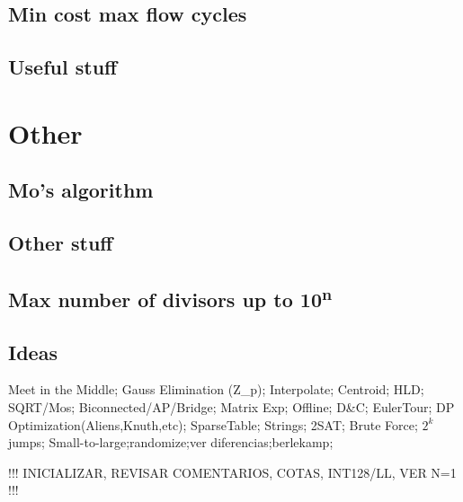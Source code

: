 \begin{multicols}{2}
\subsection{Min cost max flow cycles}

\subsection{Useful stuff}



\section{Other}

\subsection{Mo's algorithm}

\subsection{Other stuff}

\subsection{Max number of divisors up to 10\textsuperscript{n}}

\subsection{Ideas}
Meet in the Middle; Gauss Elimination (Z\_p); Interpolate; Centroid; HLD;
SQRT/Mos; Biconnected/AP/Bridge; Matrix Exp; Offline; D\&C; EulerTour;
DP Optimization(Aliens,Knuth,etc); SparseTable; Strings; 2SAT;
Brute Force; $2^k$ jumps;
Small-to-large;randomize;ver diferencias;berlekamp;

!!! INICIALIZAR, REVISAR COMENTARIOS, COTAS, INT128/LL, VER N=1 !!!



\end{multicols}



